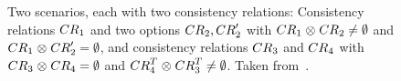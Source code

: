 

\begin{figure}
    \centering
    \begin{subfigure}{\textwidth}
        \centering
        
    \end{subfigure}

    \vspace{1em}
    \begin{subfigure}{\textwidth}
        \centering
        
    \end{subfigure}
    \caption[Examples for consistency relation concatenation]{Two scenarios, each with two consistency relations: 
    Consistency relations $\consistencyrelation{CR}{1}$ and two options $\consistencyrelation{CR}{2}, \consistencyrelation{CR}{2}'$ with $\consistencyrelation{CR}{1} \concat \consistencyrelation{CR}{2} \neq \emptyset$ and $\consistencyrelation{CR}{1} \concat \consistencyrelation{CR}{2}' = \emptyset$, and consistency relations $\consistencyrelation{CR}{3}$ and $\consistencyrelation{CR}{4}$ with $\consistencyrelation{CR}{3} \concat \consistencyrelation{CR}{4} = \emptyset$ and $\consistencyrelation{CR}{4}^T \concat \consistencyrelation{CR}{3}^T \neq \emptyset$. Taken from~.}
    \label{fig:compatibility:concatenation_example}
\end{figure}

